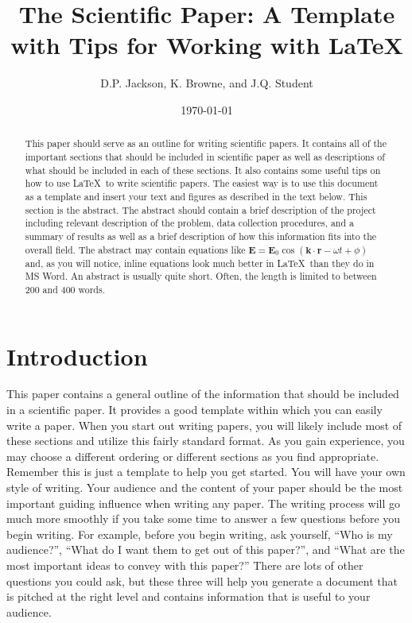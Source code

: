 \documentclass[twocolumn,pre,floats,aps,amsmath,amssymb]{revtex4}
\begin{document}
\title{The Scientific Paper: A Template with Tips for Working with
\LaTeX}
\author{D.P. Jackson, K. Browne, and J.Q. Student}
\date{\today}

\begin{abstract}
This paper should serve as an outline for writing scientific papers.
It contains all of the important sections that should be included in
scientific paper as well as descriptions of what should be included in
each of these sections. It also contains some useful tips on how to
use \LaTeX\ to write scientific papers.  The easiest way is to use
this document as a template and insert your text and figures as
described in the text below. This section is the abstract.  The
abstract should contain a brief description of the project including
relevant description of the problem, data collection procedures, and a
summary of results as well as a brief description of how this
information fits into the overall field.  The abstract may contain
equations like $\textbf{E}=\textbf{E}_0\cos
(\textbf{k}\cdot\textbf{r}-\omega t+\phi)$ and, as you will notice,
inline equations look much better in \LaTeX\ than they do in MS Word.
An abstract is usually quite short. Often, the length is limited to
between 200 and 400 words.
\end{abstract}

\maketitle

\section{Introduction}
\label{sec:intro}

This paper contains a general outline of the information that should
be included in a scientific paper.  It provides a good template within
which you can easily write a paper.    When you start out writing
papers, you will likely include most of these sections and utilize
this fairly standard format. As you gain experience, you may choose a
different ordering or different sections as you find appropriate. 
Remember this is just a template to help you get started.  You will
have your own style of writing. Your audience and the content of your
paper should be the most important guiding influence when writing any
paper.  The writing process will go much more smoothly if you take
some time to answer a few questions before you begin writing. For
example, before you begin writing, ask yourself, ``Who is my
audience?'', ``What do I want them to get out of this paper?'', and
``What are the most important ideas to convey with this paper?'' 
There are lots of other questions you could ask, but these three will
help you generate a document that is pitched at the right level and
contains information that is useful to your audience.
\end{document}
